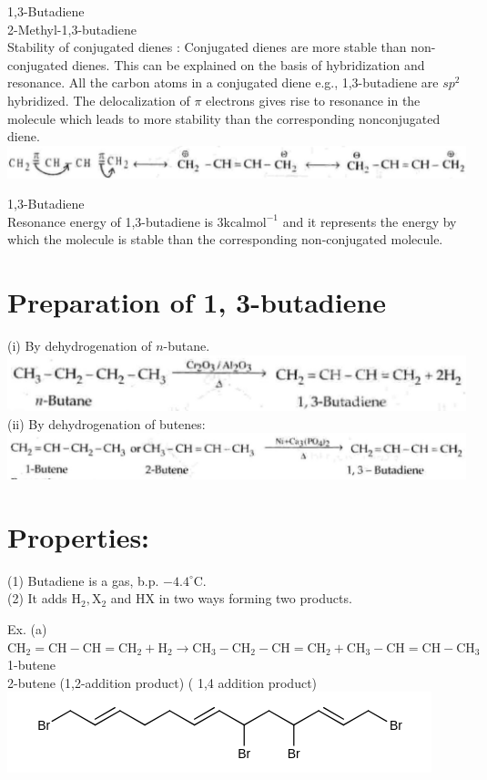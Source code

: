 \documentclass[10pt]{article}
\begin{document}
1,3-Butadiene\\
2-Methyl-1,3-butadiene\\
Stability of conjugated dienes : Conjugated dienes are more stable than non-conjugated dienes. This can be explained on the basis of hybridization and resonance. All the carbon atoms in a conjugated diene e.g., 1,3-butadiene are $s p^{2}$ hybridized. The delocalization of $\pi$ electrons gives rise to resonance in the molecule which leads to more stability than the corresponding nonconjugated diene.\\
\includegraphics[max width=\textwidth, center]{2025_01_28_8470952b98110cec3aabg-195(4)}

1,3-Butadiene\\
Resonance energy of 1,3-butadiene is $3 \mathrm{kcal} \mathrm{mol}^{-1}$ and it represents the energy by which the molecule is stable than the corresponding non-conjugated molecule.

\section*{Preparation of 1, 3-butadiene}
(i) By dehydrogenation of $n$-butane.\\
\includegraphics[max width=\textwidth, center]{2025_01_28_8470952b98110cec3aabg-195(2)}\\
(ii) By dehydrogenation of butenes:\\
\includegraphics[max width=\textwidth, center]{2025_01_28_8470952b98110cec3aabg-195(3)}

\section*{Properties:}
(1) Butadiene is a gas, b.p. $-4.4^{\circ} \mathrm{C}$.\\
(2) It adds $\mathrm{H}_{2}, \mathrm{X}_{2}$ and HX in two ways forming two products.

Ex. (a) $\mathrm{CH}_{2}=\mathrm{CH}-\mathrm{CH}=\mathrm{CH}_{2}+\mathrm{H}_{2} \longrightarrow \mathrm{CH}_{3}-\mathrm{CH}_{2}-\mathrm{CH}=\mathrm{CH}_{2}+\mathrm{CH}_{3}-\mathrm{CH}=\mathrm{CH}-\mathrm{CH}_{3}$\\
1-butene\\
2-butene (1,2-addition product) ( 1,4 addition product)\\
\includegraphics{smile-1160786ec9beb5f223406072e88e77c378bc2ae0}
\end{document}
